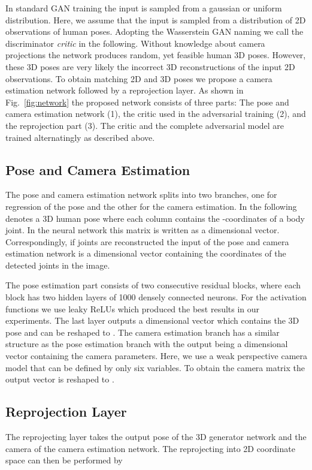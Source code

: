 \documentclass[10pt,twocolumn,letterpaper]{article}
\begin{document}
In standard GAN training the input is sampled from a gaussian or uniform distribution.
Here, we assume that the input is sampled from a distribution of 2D observations of human poses.
Adopting the Wasserstein GAN naming \cite{wgan2017} we call the discriminator \textit{critic} in the following. 
Without knowledge about camera projections the network produces random, yet feasible human 3D poses. 
However, these 3D poses are very likely the incorrect 3D reconstructions of the input 2D observations.
To obtain matching 2D and 3D poses we propose a camera estimation network followed by a reprojection layer.
As shown in Fig.~\ref{fig:network} the proposed network consists of three parts: The pose and camera estimation network (1), the critic used in the adversarial training (2), and the reprojection part (3). 
The critic and the complete adversarial model are trained alternatingly as described above.

\subsection{Pose and Camera Estimation}
The pose and camera estimation network splits into two branches, one for regression of the pose and the other for the camera estimation.
In the following  denotes a 3D human pose where each column contains the -coordinates of a body joint.
In the neural network this matrix is written as a  dimensional vector.
Correspondingly, if  joints are reconstructed the input of the pose and camera estimation network is a  dimensional vector containing the coordinates of the detected joints in the image.

The pose estimation part consists of two consecutive residual blocks, where each block has two hidden layers of 1000 densely connected neurons. 
For the activation functions we use leaky ReLUs \cite{leakyrelu2015} which produced the best results in our experiments.
The last layer outputs a  dimensional vector which contains the 3D pose and can be reshaped to .
The camera estimation branch has a similar structure as the pose estimation branch with the output being a  dimensional vector containing the camera parameters.
Here, we use a weak perspective camera model that can be defined by only six variables.
To obtain the camera matrix the output vector is reshaped to .

\subsection{Reprojection Layer}
The reprojecting layer takes the output pose  of the 3D generator network and the camera  of the camera estimation network.
The reprojecting into 2D coordinate space can then be performed by
\end{document}
